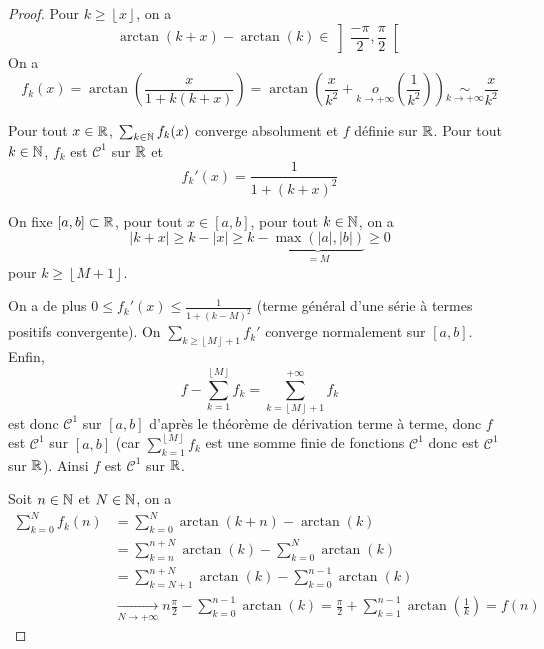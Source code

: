 \documentclass[12pt]{article}
\begin{document}
\begin{proof}
    Pour $k\geqslant \left\lfloor x\right\rfloor$, on a 
    \begin{equation*}
        \arctan(k+x)-\arctan(k)\in\left]\frac{-\pi}{2},\frac{\pi}{2}\right[
    \end{equation*}
    On a 
    \begin{equation*}
        f_{k}(x)=\arctan\left(\frac{x}{1+k(k+x)}\right)=\arctan\left(\frac{x}{k^{2}}+\underset{k\to+\infty}{o}\left(\frac{1}{k^{2}}\right)\right)\underset{k\to+\infty}{\sim}\frac{x}{k^{2}}
    \end{equation*}

    Pour tout $x\in\mathbb{R}$, $\sum_{k\in\mathbb{N}}f_{k}(x)$ converge absolument et $f$ définie sur $\mathbb{R}$. Pour tout $k\in\mathbb{N}$, $f_{k}$ est $\mathcal{C}^{1}$ sur $\mathbb{R}$ et 
    \begin{equation*}
        f_{k}'(x)=\frac{1}{1+(k+x)^{2}}
    \end{equation*}

    On fixe $[a,b]\subset\mathbb{R}$, pour tout $x\in[a,b]$, pour tout $k\in\mathbb{N}$, on a \begin{equation*}
        \left\lvert k+x\right\rvert\geqslant k-\left\lvert x\right\rvert \geqslant k-\underbrace{\max\left(\left\lvert a\right\rvert,\left\lvert b\right\rvert\right)}_{=M}\geqslant 0    
    \end{equation*}
    pour $k\geqslant \left\lfloor M+1\right\rfloor$.

    On a de plus $0\leqslant f_{k}'(x)\leqslant \frac{1}{1+(k-M)^{2}}$ (terme général d'une série à termes positifs convergente). On $\sum_{k\geqslant\left\lfloor M\right\rfloor+1}f_{k}'$ converge normalement sur $[a,b]$. Enfin, 
    \begin{equation*}
        f-\sum_{k=1}^{\left\lfloor M\right\rfloor}f_{k}=\sum_{k=\left\lfloor M\right\rfloor+1}^{+\infty}f_{k}
    \end{equation*}
    est donc $\mathcal{C}^{1}$ sur $[a,b]$ d'après le théorème de dérivation terme à terme, donc $f$ est $\mathcal{C}^{1}$ sur $[a,b]$ (car $\sum_{k=1}^{\left\lfloor M\right\rfloor}f_{k}$ est une somme finie de fonctions $\mathcal{C}^{1}$ donc est $\mathcal{C}^{1}$ sur $\mathbb{R}$). Ainsi $f$ est $\mathcal{C}^{1}$ sur $\mathbb{R}$.

    Soit $n\in\mathbb{N}$ et $N\in\mathbb{N}$, on a 
    \begin{align*}
        \sum_{k=0}^{N}f_{k}(n)
        &=\sum_{k=0}^{N}\arctan(k+n)-\arctan(k)\\
        &=\sum_{k=n}^{n+N}\arctan(k)-\sum_{k=0}^{N}\arctan(k)\\
        &=\sum_{k=N+1}^{n+N}\arctan(k)-\sum_{k=0}^{n-1}\arctan(k)\\
        &\xrightarrow[N\to+\infty]{}n\frac{\pi}{2}-\sum_{k=0}^{n-1}\arctan(k)=\frac{\pi}{2}+\sum_{k=1}^{n-1}\arctan(\frac{1}{k})=f(n)
    \end{align*}


\end{proof}
\end{document}
